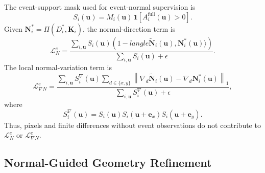 The event-support mask used for event-normal supervision is
\begin{equation}
    S_i(\bm u)=M_i(\bm u)\,
    \mathbf{1}[A_i^{\mathrm{full}}(\bm u)>0].
    \label{eq:event_normal_support}
\end{equation}
Given $\bm N_i^{*}=\Pi(D_i^{*},\bm K_i)$, the normal-direction term is
\begin{equation}
    \mathcal{L}_{N}^{e}=
    \frac{\sum_{i,\bm u}S_i(\bm u)
    \left(1-langle
    \widetilde{\bm N}_i(\bm u),
    \bm N_i^{*}(\bm u)\rangle\right)}
    {\sum_{i,\bm u}S_i(\bm u)+\epsilon}.
    \label{eq:event_normal_direction_loss}
\end{equation}
The local normal-variation term is
\begin{equation}
    \mathcal{L}_{\nabla N}^{e}=
    \frac{\sum_{i,\bm u}S_i^{\nabla}(\bm u)
    \sum_{d\in\{x,y\}}
    \left\|
    \nabla_d\widetilde{\bm N}_i(\bm u)-
    \nabla_d\bm N_i^{*}(\bm u)
    \right\|_1}
    {\sum_{i,\bm u}S_i^{\nabla}(\bm u)+\epsilon},
    \label{eq:event_normal_derivative_loss}
\end{equation}
where
\begin{equation}
    S_i^{\nabla}(\bm u)=
    S_i(\bm u)S_i(\bm u+\bm e_x)S_i(\bm u+\bm e_y).
    \label{eq:normal_derivative_support}
\end{equation}
Thus, pixels and finite differences without event observations do not
contribute to $\mathcal{L}_{N}^{e}$ or
$\mathcal{L}_{\nabla N}^{e}$.


\subsection{Normal-Guided Geometry Refinement}
\label{sec:normal_guided_refinement}

